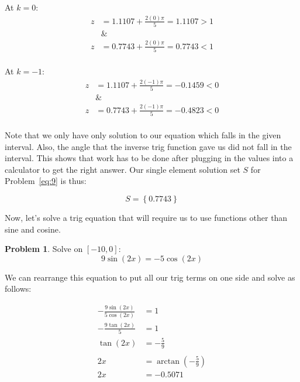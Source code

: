 \documentclass[12pt]{article}
\theoremstyle{definition}
\newtheorem{problem}{Problem}
\begin{document}
At $k=0$:
\begin{align}
    z & = 1.1107 + \frac{2(0)\pi}{5} = 1.1107 > 1 \\
      & \&                                        \\
    z & = 0.7743 + \frac{2(0)\pi}{5} = 0.7743 < 1 \\
\end{align}

At $k=-1$:
\begin{align}
    z & = 1.1107 + \frac{2(-1)\pi}{5} = -0.1459 < 0 \\
      & \&                                          \\
    z & = 0.7743 + \frac{2(-1)\pi}{5} = -0.4823 < 0 \\
\end{align}

Note that we only have only solution to our equation which falls in the given interval.
Also, the angle that the inverse trig function gave us did not fall in the interval.
This shows that work has to be done after plugging in the values into a calculator to get the right answer.
Our single element solution set $S$ for Problem~\eqref{eq:9} is thus:

\begin{equation}
    S = \left\{ 0.7743 \right\}
\end{equation}

Now, let's solve a trig equation that will require us to use functions other than sine and cosine.

\begin{problem}
Solve on $[-10, 0]$:
\begin{equation*}
    9\sin(2x) = -5\cos(2x) \label{eq:10}
\end{equation*}
\end{problem}

We can rearrange this equation to put all our trig terms on one side and solve as follows:

\begin{align}
    -\frac{9\sin(2x)}{5\cos(2x)} & = 1                                \\
    -\frac{9\tan(2x)}{5}         & = 1                                \\
    \tan(2x)                     & = -\frac{5}{9}                     \\
    \nonumber                                                         \\
    2x                           & = \arctan\left(-\frac{5}{9}\right) \\
    2x                           & = -0.5071
\end{align}
\end{document}
